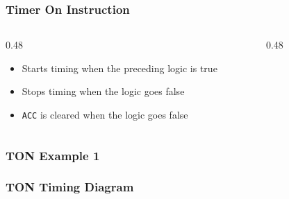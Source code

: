 \begin{frame}
    \frametitle{Timer On Instruction}

    \begin{columns}
        \begin{column}{0.48\linewidth}
            \begin{itemize}
                \item Starts timing when the preceding logic is true
                \item Stops timing when the logic goes false
                \item \texttt{ACC} is cleared when the logic goes false
            \end{itemize}
        \end{column}
        \begin{column}{0.48\linewidth}
            \begin{figure}
                \centering
                
            \end{figure}
        \end{column}
    \end{columns}
\end{frame}

\begin{frame}
    \frametitle{TON Example 1}

    \begin{figure}
        \centering
        
    \end{figure}
\end{frame}

\begin{frame}
    \frametitle{TON Timing Diagram}

    \begin{figure}
        \centering
        \resizebox{0.875\linewidth}{!}{
            
        }
    \end{figure}    
\end{frame}

